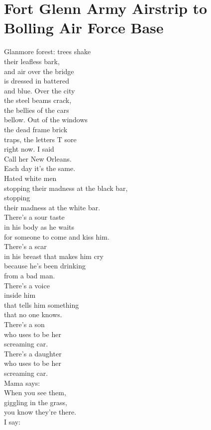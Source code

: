 \documentclass[smalldemyvopaper,11pt,twoside,onecolumn,openright,extrafontsizes]{memoir}
\begin{document}
\chapter{Fort Glenn Army Airstrip to Bolling Air Force Base}
Glanmore forest: trees shake
\\their leafless bark,
\\and air over the bridge
\\is dressed in battered
\\and blue. Over the city
\\the steel beams crack,
\\the bellies of the cars
\\bellow. Out of the windows
\\the dead frame brick
\\traps, the letters T sore
\\right now. I said
\\Call her New Orleans.
\\Each day it's the same.
\\Hated white men
\\stopping their madness at the black bar,
\\stopping
\\their madness at the white bar.
\\There's a sour taste
\\in his body as he waits
\\for someone to come and kiss him.
\\There's a scar
\\in his breast that makes him cry
\\because he's been drinking
\\from a bad man.
\\There's a voice
\\inside him
\\that tells him something
\\that no one knows.
\\There's a son
\\who uses to be her
\\screaming car.
\\There's a daughter
\\who uses to be her
\\screaming car.
\\Mama says:
\\When you see them,
\\giggling in the grass,
\\you know they're there.
\\I say:
\end{document}
